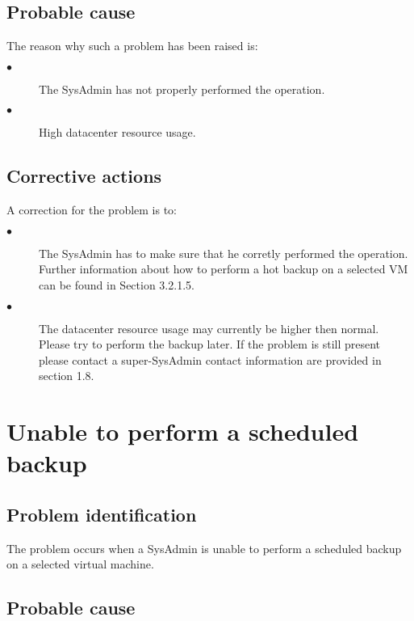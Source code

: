 \subsection{Probable cause}

The reason why such a problem has been raised is:\\
\begin{description}
\item[$\bullet$] The SysAdmin has not properly performed the operation.
\item[$\bullet$] High datacenter resource usage.
\end{description}


\subsection{Corrective actions}

A correction for the problem is to:\\
\begin{description}
\item[$\bullet$] The SysAdmin has to make sure that he corretly performed the operation. 
Further information about how to perform a hot backup on a selected VM can be found in 
Section 3.2.1.5.
\item[$\bullet$] The datacenter resource usage may currently be higher then normal. Please
try to perform the backup later. If the problem is still present please contact a super-SysAdmin
contact information are provided in section 1.8.
\end{description}








\section{Unable to perform a scheduled backup}

\subsection{Problem identification}
The problem occurs when a SysAdmin is unable to perform a scheduled
backup on a selected virtual machine.

\subsection{Probable cause}

